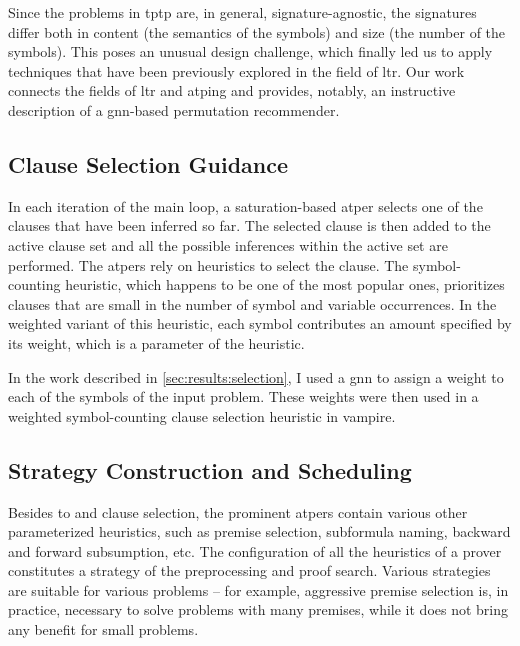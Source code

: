 Since the problems in \gls{tptp} are, in general, signature-agnostic,
the signatures differ both in content (the semantics of the symbols) and size (the number of the symbols).
This poses an unusual design challenge,
which finally led us to apply techniques that have been previously explored in the field of \gls{ltr}.
Our work connects the fields of \gls{ltr} and \gls{atping} and provides, notably, an instructive description of a \acrshort{gnn}-based permutation recommender.

\subsection{Clause Selection Guidance}
\label{sec:contrib:ClauseSelection}

In each iteration of the main loop,
a saturation-based \gls{atper} selects one of the clauses that have been inferred so far.
The selected clause is then added to the active clause set and all the possible inferences within the active set are performed.
The \glspl{atper} rely on heuristics to select the clause.
The symbol-counting heuristic, which happens to be one of the most popular ones,
prioritizes clauses that are small in the number of symbol and variable occurrences.
In the weighted variant of this heuristic,
each symbol contributes an amount specified by its weight,
which is a parameter of the heuristic.

In the work described in \cref{sec:results:selection},
I used a \gls{gnn} to assign a weight to each of the symbols of the input problem.
These weights were then used in a weighted symbol-counting clause selection heuristic in \gls{vampire}.

\subsection{Strategy Construction and Scheduling}

Besides \gls{to} and clause selection, the prominent \glspl{atper} contain various other parameterized heuristics,
such as premise selection, subformula naming, backward and forward subsumption, etc.
The configuration of all the heuristics of a prover constitutes a strategy of the preprocessing and proof search.
Various strategies are suitable for various problems -- for example, aggressive premise selection is, in practice, necessary to solve problems with many premises, while it does not bring any benefit for small problems.

